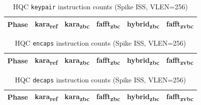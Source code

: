 
\begin{table}[h]
  \centering
  \caption{HQC \texttt{keypair} instruction counts (Spike ISS, VLEN=256)}
  \label{tab:keypair_counts}
  \begin{tabular}{lrrrrr}
    \toprule
    Phase & kara\textsubscript{ref} & kara\textsubscript{zbc} & fafft\textsubscript{zbc} & hybrid\textsubscript{zbc} & fafft\textsubscript{zvbc} \\
    \midrule
    \bottomrule
  \end{tabular}
\end{table}

\begin{table}[h]
  \centering
  \caption{HQC \texttt{encaps} instruction counts (Spike ISS, VLEN=256)}
  \label{tab:encaps_counts}
  \begin{tabular}{lrrrrr}
    \toprule
    Phase & kara\textsubscript{ref} & kara\textsubscript{zbc} & fafft\textsubscript{zbc} & hybrid\textsubscript{zbc} & fafft\textsubscript{zvbc} \\
    \midrule
    \bottomrule
  \end{tabular}
\end{table}

\begin{table}[h]
  \centering
  \caption{HQC \texttt{decaps} instruction counts (Spike ISS, VLEN=256)}
  \label{tab:decaps_counts}
  \begin{tabular}{lrrrrr}
    \toprule
    Phase & kara\textsubscript{ref} & kara\textsubscript{zbc} & fafft\textsubscript{zbc} & hybrid\textsubscript{zbc} & fafft\textsubscript{zvbc} \\
    \midrule
    \bottomrule
  \end{tabular}
\end{table}

